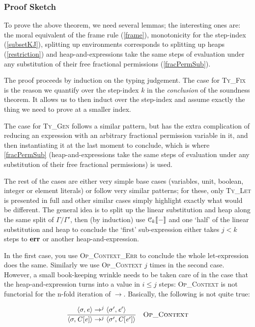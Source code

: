 \subsubsection{Proof Sketch}

To prove the above theorem, we need several lemmas; the interesting ones are:
the moral equivalent of the frame rule (\ref{frame}), monotonicity for the
step-index (\ref{subsetKJ}), splitting up environments corresponds to splitting
up heaps (\ref{restriction}) and heap-and-expressions take the same steps of
evaluation under any substitution of their free fractional
permissions (\ref{fracPermSub}).

The proof proceeds by induction on the typing judgement.  The case for
\textsc{Ty\_Fix} is the reason we quantify over the step-index $k$ in the
\emph{conclusion} of the soundness theorem. It allows us to then induct over
the step-index and assume exactly the thing we need to prove at a smaller index.

The case for \textsc{Ty\_Gen} follows a similar pattern, but has the extra
complication of reducing an expression with an arbitrary fractional permission
variable in it, and then instantiating it at the last moment to conclude,
which is where \ref{fracPermSub} (heap-and-expressions take the same steps of
evaluation under any substitution of their free fractional permissions) is
used.

The rest of the cases are either very simple base cases (variables, unit,
boolean, integer or element literals) or follow very similar patterns; for
these, only \textsc{Ty\_Let} is presented in full and other similar cases
simply highlight exactly what would be different.  The general idea is to split
up the linear substitution and heap along the same split of $\Gamma/\Gamma'$,
then (by induction) use $\mathcal{C}_{k} [\![ - ]\!]$ and one `half' of the  linear substitution
and heap to conclude the `first' sub-expression either takes $j< k$ steps to
$\mathbf{err}$ or another heap-and-expression.

In the first case, you use \textsc{Op\_Context\_Err} to conclude the whole
let-expression does the same. Similarly we use \textsc{Op\_Context} $j$ times
in the second case. However, a small book-keeping wrinkle needs to be taken
care of in the case that the heap-and-expression turns into a value in $i \leq
j$ steps: \textsc{Op\_Context} is not functorial for the n-fold iteration of
$\rightarrow$.  Basically, the following is not quite true:

\vspace{-\baselineskip}
\[
\ottdrule{%
    \ottpremise{\langle  \sigma  \ottsym{,}  \ottnt{e}  \rangle  \rightarrow^j  \langle  \sigma'  \ottsym{,}  \ottnt{e'}  \rangle}%
    }{
    \langle  \sigma  \ottsym{,}  \ottnt{C}  \ottsym{[}  \ottnt{e}  \ottsym{]}  \rangle  \rightarrow^j  \langle  \sigma'  \ottsym{,}  \ottnt{C}  \ottsym{[}  \ottnt{e'}  \ottsym{]}  \rangle}{%
    {\ottdrulename{Op\_Context}}{}%
}
\]

